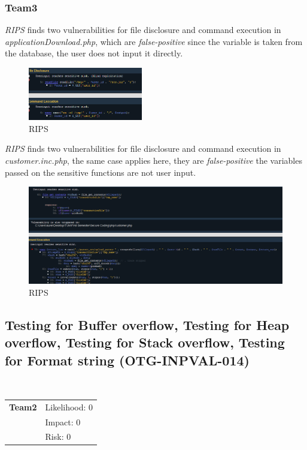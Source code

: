 \documentclass[headsepline,footsepline,footinclude=false,oneside,fontsize=11pt,paper=a4,listof=totoc,bibliography=totoc]{scrbook} %
\begin{document}
\subsubsection{Team3}
\textit{RIPS} finds two vulnerabilities for file disclosure and command execution in \textit{applicationDownload.php}, which are \textit{false-positive} since the variable is taken from the database, the user does not input it directly.
\begin{figure}[H]
	\centering
	\includegraphics[width=50mm]{logos/download3.jpg}
	\caption{RIPS \label{overflow}}
\end{figure}
\textit{RIPS} finds two vulnerabilities for file disclosure and command execution in \textit{customer.inc.php}, the same case applies here, they are \textit{false-positive} the variables passed on the sensitive functions are not user input.
\begin{figure}[H]
	\centering
	\includegraphics[width=150mm]{logos/trans3.jpg}
	\caption{RIPS \label{overflow}}
\end{figure}
\pagebreak
\subsection{Testing for Buffer overflow, Testing for Heap overflow, Testing for Stack overflow, Testing for Format string (OTG-INPVAL-014)}\

\begin{tabular}{cR{12cm}}
	\textbf{Team2} & Likelihood: 0\\& Impact: 0\\& Risk: 0
\end{tabular}
\end{document}
